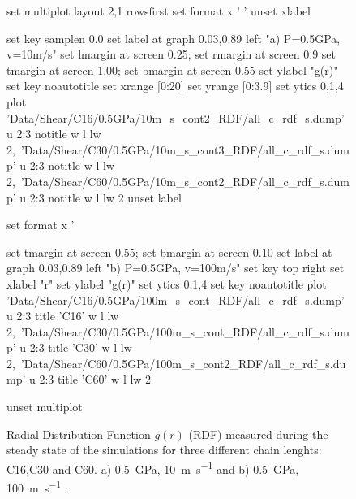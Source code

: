 \documentclass[aps,prb,reprint,superscriptaddress, a4paper]{revtex4-1}
\begin{document}
\begin{figure}
    	\begin{center}
		\begin{gnuplot}[terminal=pdf, terminaloptions={size \SERFigwidth cm, \SERFigheight cm color solid}]
			set multiplot layout 2,1 rowsfirst
			set format x ' '
			unset xlabel

			set key samplen  0.0
			set label at graph 0.03,0.89 left "a) P=0.5GPa, v=10m/s"
			set lmargin at screen 0.25; set rmargin at screen 0.9
			set tmargin at screen 1.00; set bmargin at screen 0.55
			set ylabel "g(r)"
			set key noautotitle
			set xrange [0:20]
			set yrange [0:3.9]
			set ytics 0,1,4
			plot  	'Data/Shear/C16/0.5GPa/10m_s_cont2_RDF/all_c_rdf_s.dump' u  2:3 notitle   w l lw 2,\
		        	'Data/Shear/C30/0.5GPa/10m_s_cont3_RDF/all_c_rdf_s.dump' u  2:3 notitle   w l lw 2,\
		        	'Data/Shear/C60/0.5GPa/10m_s_cont2_RDF/all_c_rdf_s.dump' u  2:3 notitle   w l lw 2
	    	unset label

			set format x '%

			set tmargin at screen 0.55; set bmargin at screen 0.10
			set label at graph 0.03,0.89 left "b) P=0.5GPa, v=100m/s"
			set key top right
			set xlabel "r"  
			set ylabel "g(r)"
			set ytics 0,1,4
			set key noautotitle
			plot  	'Data/Shear/C16/0.5GPa/100m_s_cont_RDF/all_c_rdf_s.dump' u  2:3 title  'C16' w l lw 2,\
		        	'Data/Shear/C30/0.5GPa/100m_s_cont_RDF/all_c_rdf_s.dump' u  2:3 title  'C30' w l lw 2,\
		        	'Data/Shear/C60/0.5GPa/100m_s_cont2_RDF/all_c_rdf_s.dump' u  2:3 title  'C60' w l lw 2

			unset multiplot
		\end{gnuplot}
		\caption{Radial Distribution Function $g(r)$ (RDF) measured during the steady state of the simulations for three different chain lenghts: C16,C30 and C60. a) \SI{0.5}{\giga\pascal},  \SI{10}{\meter\per\second} and  b) \SI{0.5}{\giga\pascal},  \SI{100}{\meter\per\second}  .
}
		\label{fig:RDF}
	\end{center}
 \end{figure}		
		
		
\end{document}
